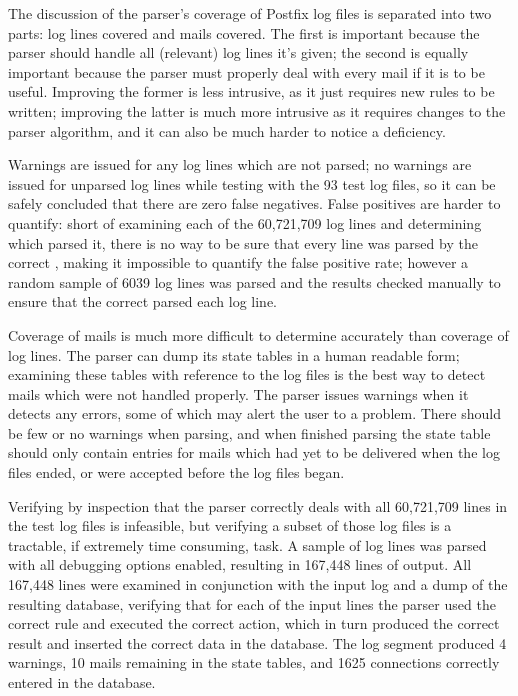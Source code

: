 \documentclass[draft]{svmult}
\newcommand{\numberOFlogFILES}[0]{%
    93%
}
\begin{document}
The discussion of the parser's coverage of Postfix log files is separated
into two parts: log lines covered and mails covered.  The first is
important because the parser should handle all (relevant) log lines it's
given; the second is equally important because the parser must properly
deal with every mail if it is to be useful.  Improving the former is
less intrusive, as it just requires new rules to be written; improving the
latter is much more intrusive as it requires changes to the parser
algorithm, and it can also be much harder to notice a deficiency.

Warnings are issued for any log lines which are not parsed; no warnings are
issued for unparsed log lines while testing with the \numberOFlogFILES{}
test log files, so it can be safely concluded that there are zero false
negatives.  False positives are harder to quantify: short of examining each
of the 60,721,709 log lines and determining which \regex{} parsed it, there
is no way to be sure that every line was parsed by the correct \regex{},
making it impossible to quantify the false positive rate; however a random
sample of 6039 log lines was parsed and the results checked manually to
ensure that the correct \regex{} parsed each log line.

Coverage of mails is much more difficult to determine accurately than
coverage of log lines.  The parser can dump its state tables in a human
readable form; examining these tables with reference to the log files is
the best way to detect mails which were not handled properly.  The parser
issues warnings when it detects any errors, some of which may alert the
user to a problem.  There should be few or no warnings when parsing, and
when finished parsing the state table should only contain entries for mails
which had yet to be delivered when the log files ended, or were accepted
before the log files began.

Verifying by inspection that the parser correctly deals with all 60,721,709
lines in the test log files is infeasible, but verifying a subset of those
log files is a tractable, if extremely time consuming, task.  A sample of
log lines was parsed with all debugging options enabled, resulting in
167,448 lines of output.  All 167,448 lines were examined in conjunction
with the input log and a dump of the resulting database, verifying that for
each of the input lines the parser used the correct rule and executed the
correct action, which in turn produced the correct result and inserted the
correct data in the database.  The log segment produced 4 warnings, 10
mails remaining in the state tables, and 1625 connections correctly entered
in the database.
\end{document}
